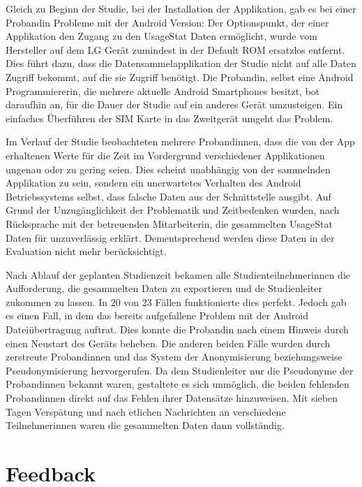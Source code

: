 Gleich zu Beginn der Studie, bei der Installation der Applikation, gab es bei einer Probandin Probleme mit der Android Version:
Der Optionspunkt, der einer Applikation den Zugang zu den UsageStat Daten ermöglicht, wurde vom Hersteller auf dem LG Gerät zumindest in der Default ROM ersatzlos entfernt.
Dies führt dazu, dass die Datensammelapplikation der Studie nicht auf alle Daten Zugriff bekommt, auf die sie Zugriff benötigt.
Die Probandin, selbst eine Android Programmiererin, die mehrere aktuelle Android Smartphones besitzt, bot daraufhin an, für die Dauer der Studie auf ein anderes Gerät umzusteigen.
Ein einfaches Überführen der SIM Karte in das Zweitgerät umgeht das Problem.
\par
Im Verlauf der Studie beobachteten mehrere Probandinnen,  dass die von der App erhaltenen Werte für die Zeit im Vordergrund verschiedener Applikationen ungenau oder zu gering seien.
Dies scheint unabhängig von der sammelnden Applikation zu sein, sondern ein unerwartetes Verhalten des Android Betriebssystems selbst, dass falsche Daten aus der Schnittstelle ausgibt.
Auf Grund der Unzugänglichkeit der Problematik und Zeitbedenken wurden, nach Rücksprache mit der betreuenden Mitarbeiterin, die gesammelten UsageStat Daten für unzuverlässig erklärt.
Dementsprechend werden diese Daten in der Evaluation nicht mehr berücksichtigt.
\par
Nach Ablauf der geplanten Studienzeit bekamen alle Studienteilnehmerinnen die Aufforderung, die gesammelten Daten zu exportieren und de Studienleiter zukommen zu lassen. 
In 20 von 23 Fällen funktionierte dies perfekt.
Jedoch gab es einen Fall, in dem das bereits aufgefallene Problem \cite{androidbug} mit der Android Dateiübertragung auftrat.
Dies konnte die Probandin nach einem Hinweis durch einen Neustart des Geräts beheben.
Die anderen beiden Fälle wurden durch zerstreute Probandinnen und das System der Anonymisierung beziehungsweise Pseudonymisierung hervorgerufen.
Da dem Studienleiter nur die Pseudonyme der Probandinnen bekannt waren, gestaltete es sich unmöglich, die beiden fehlenden Probandinnen direkt auf das Fehlen ihrer Datensätze hinzuweisen.
Mit sieben Tagen Verspätung und nach etlichen Nachrichten an verschiedene Teilnehmerinnen waren die gesammelten Daten dann vollständig.

\section{Feedback}
\label{feedback}

